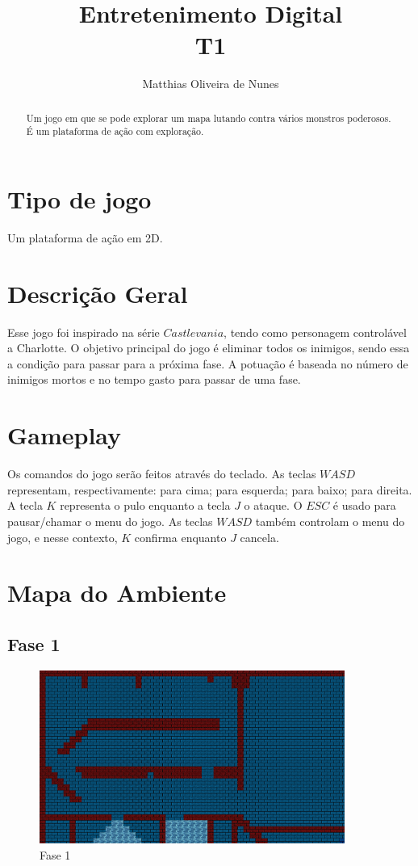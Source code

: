 \documentclass[12pt]{article}
\title{Entretenimento Digital \\ T1}
\author{Matthias Oliveira de Nunes}
\begin{document}
\maketitle

\begin{abstract}

Um jogo em que se pode explorar um mapa lutando contra vários monstros
poderosos. É um plataforma de ação com exploração.

\end{abstract}

\section{Tipo de jogo}

Um plataforma de ação em 2D.

\section{Descrição Geral}

Esse jogo foi inspirado na série $Castlevania$, tendo como personagem
controlável a Charlotte. O objetivo principal do jogo é eliminar todos os
inimigos, sendo essa a condição para passar para a próxima fase. A potuação é
baseada no número de inimigos mortos e no tempo gasto para passar de uma fase.

\section{Gameplay}

Os comandos do jogo serão feitos através do teclado. As teclas $WASD$
representam, respectivamente: para cima; para esquerda; para baixo; para
direita. A tecla $K$ representa o pulo enquanto a tecla $J$ o ataque. O $ESC$ é
usado para pausar/chamar o menu do jogo. As teclas $WASD$ também controlam o
menu do jogo, e nesse contexto, $K$ confirma enquanto $J$ cancela.

\section{Mapa do Ambiente}

\subsection{Fase 1}

\begin{figure}[H]
\centering
\includegraphics[width=100mm]{map1.png}
\caption{Fase 1}
\label{m1}
\end{figure}
\end{document}
